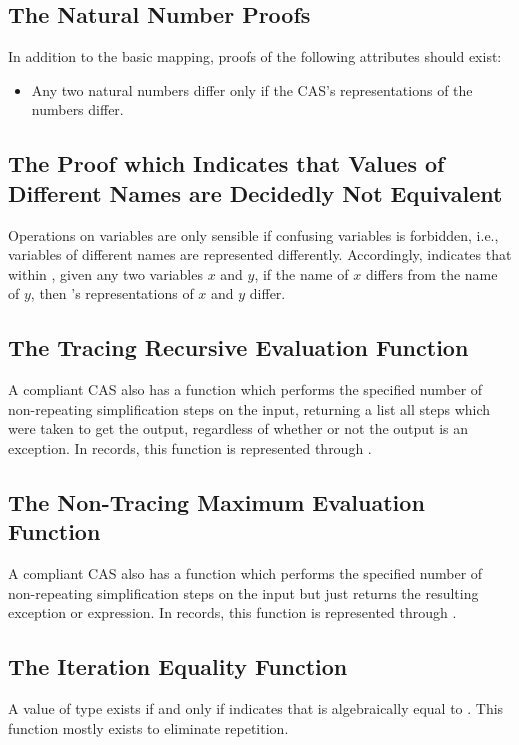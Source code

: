 \documentclass{report}
\begin{document}
\subsection{The Natural Number Proofs}
In addition to the basic mapping, proofs of the following attributes should exist:

\begin{itemize}
  \item Any two natural numbers differ only if the CAS's representations of the numbers differ.
\end{itemize}

\subsection{The Proof which Indicates that Values of Different Names are Decidedly Not Equivalent}
Operations on variables are only sensible if confusing variables is forbidden, i.e., variables of different names are represented differently.  Accordingly,   indicates that within , given any two variables \(x\) and \(y\), if the name of \(x\) differs from the name of \(y\), then 's representations of \(x\) and \(y\) differ.

\subsection{The Tracing Recursive Evaluation Function}
A compliant CAS also has a function which performs the specified number of non-repeating simplification steps on the input, returning a list all steps which were taken to get the output, regardless of whether or not the output is an exception.  In  records, this function is represented through .

\subsection{The Non-Tracing Maximum Evaluation Function}
A compliant CAS also has a function which performs the specified number of non-repeating simplification steps on the input but just returns the resulting exception or expression.  In  records, this function is represented through .

\subsection{The Iteration Equality Function}
A value of type      exists if and only if      indicates that  is algebraically equal to .  This function mostly exists to eliminate repetition.
\end{document}
